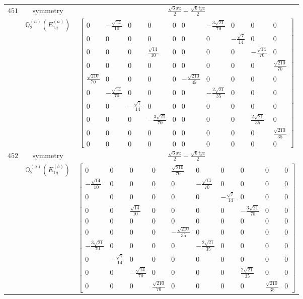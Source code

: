 \documentclass[fleqn,8pt,landscape]{jsarticle}
\begin{document}
\begin{longtable}{ccc}
$ 451 $ & $ \text{symmetry} $ & $ \frac{\sqrt{6} x z}{2} + \frac{\sqrt{6} i y z}{2} $ \\
$  $ & $ \mathbb{Q}_{2}^{(a)}(E_{1g}^{(a)}) $ & $ \begin{bmatrix} 0 & - \frac{\sqrt{14}}{10} & 0 & 0 & 0 & 0 & - \frac{3 \sqrt{21}}{70} & 0 & 0 & 0 \\ 0 & 0 & 0 & 0 & 0 & 0 & 0 & - \frac{\sqrt{7}}{14} & 0 & 0 \\ 0 & 0 & 0 & \frac{\sqrt{14}}{10} & 0 & 0 & 0 & 0 & - \frac{\sqrt{14}}{70} & 0 \\ 0 & 0 & 0 & 0 & 0 & 0 & 0 & 0 & 0 & \frac{\sqrt{210}}{70} \\ \frac{\sqrt{210}}{70} & 0 & 0 & 0 & 0 & - \frac{\sqrt{210}}{35} & 0 & 0 & 0 & 0 \\ 0 & - \frac{\sqrt{14}}{70} & 0 & 0 & 0 & 0 & - \frac{2 \sqrt{21}}{35} & 0 & 0 & 0 \\ 0 & 0 & - \frac{\sqrt{7}}{14} & 0 & 0 & 0 & 0 & 0 & 0 & 0 \\ 0 & 0 & 0 & - \frac{3 \sqrt{21}}{70} & 0 & 0 & 0 & 0 & \frac{2 \sqrt{21}}{35} & 0 \\ 0 & 0 & 0 & 0 & 0 & 0 & 0 & 0 & 0 & \frac{\sqrt{210}}{35} \\ 0 & 0 & 0 & 0 & 0 & 0 & 0 & 0 & 0 & 0 \end{bmatrix} $ \\ \hline
$ 452 $ & $ \text{symmetry} $ & $ \frac{\sqrt{6} x z}{2} - \frac{\sqrt{6} i y z}{2} $ \\
$  $ & $ \mathbb{Q}_{2}^{(a)}(E_{1g}^{(b)}) $ & $ \begin{bmatrix} 0 & 0 & 0 & 0 & \frac{\sqrt{210}}{70} & 0 & 0 & 0 & 0 & 0 \\ - \frac{\sqrt{14}}{10} & 0 & 0 & 0 & 0 & - \frac{\sqrt{14}}{70} & 0 & 0 & 0 & 0 \\ 0 & 0 & 0 & 0 & 0 & 0 & - \frac{\sqrt{7}}{14} & 0 & 0 & 0 \\ 0 & 0 & \frac{\sqrt{14}}{10} & 0 & 0 & 0 & 0 & - \frac{3 \sqrt{21}}{70} & 0 & 0 \\ 0 & 0 & 0 & 0 & 0 & 0 & 0 & 0 & 0 & 0 \\ 0 & 0 & 0 & 0 & - \frac{\sqrt{210}}{35} & 0 & 0 & 0 & 0 & 0 \\ - \frac{3 \sqrt{21}}{70} & 0 & 0 & 0 & 0 & - \frac{2 \sqrt{21}}{35} & 0 & 0 & 0 & 0 \\ 0 & - \frac{\sqrt{7}}{14} & 0 & 0 & 0 & 0 & 0 & 0 & 0 & 0 \\ 0 & 0 & - \frac{\sqrt{14}}{70} & 0 & 0 & 0 & 0 & \frac{2 \sqrt{21}}{35} & 0 & 0 \\ 0 & 0 & 0 & \frac{\sqrt{210}}{70} & 0 & 0 & 0 & 0 & \frac{\sqrt{210}}{35} & 0 \end{bmatrix} $ \\ \hline

\end{longtable}
\end{document}
